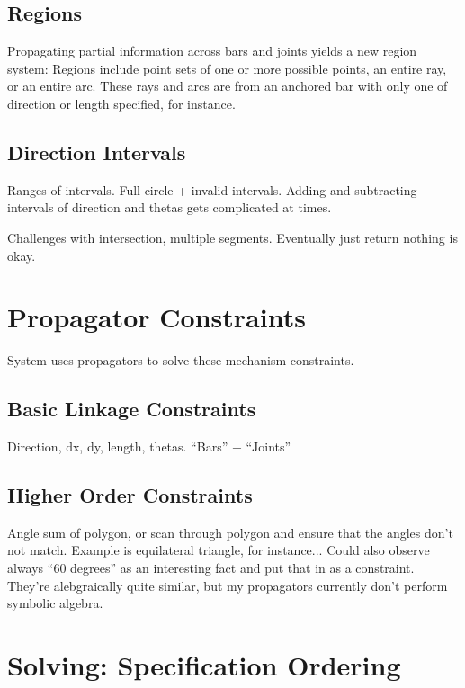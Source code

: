 \subsection{Regions}

Propagating partial information across bars and joints yields a new
region system: Regions include point sets of one or more possible
points, an entire ray, or an entire arc. These rays and arcs are
from an anchored bar with only one of direction or length specified,
for instance.

\subsection{Direction Intervals}

Ranges of intervals. Full circle + invalid intervals. Adding and
subtracting intervals of direction and thetas gets complicated at times.

Challenges with intersection, multiple segments. Eventually just
return nothing is okay.

\section{Propagator Constraints}

System uses propagators to solve these mechanism constraints.

\subsection{Basic Linkage Constraints}

Direction, dx, dy, length, thetas. ``Bars'' + ``Joints''

\subsection{Higher Order Constraints}

Angle sum of polygon, or scan through polygon and ensure that the
angles don't not match. Example is equilateral triangle, for
instance... Could also observe always ``60 degrees'' as an interesting
fact and put that in as a constraint. They're alebgraically quite
similar, but my propagators currently don't perform symbolic algebra.

\section{Solving: Specification Ordering}

